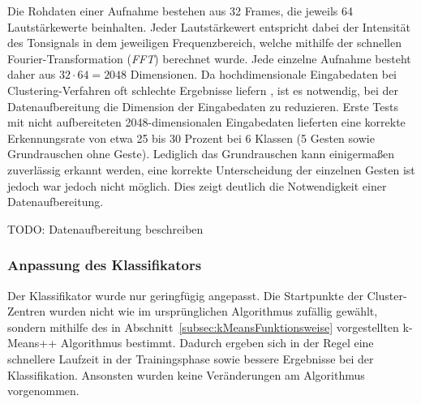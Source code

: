 Die Rohdaten einer Aufnahme bestehen aus 32 Frames, die jeweils 64 Lautstärkewerte beinhalten. Jeder Lautstärkewert entspricht dabei der Intensität des Tonsignals in dem jeweiligen Frequenzbereich, welche mithilfe der schnellen Fourier-Transformation (\emph{FFT}) \cite{fftMathebuch} berechnet wurde. Jede einzelne Aufnahme besteht daher aus $32 \cdot 64 = 2048$ Dimensionen.  Da hochdimensionale Eingabedaten bei Clustering-Verfahren oft schlechte Ergebnisse liefern \cite{kMeansHighDimensions}, ist es notwendig, bei der Datenaufbereitung die Dimension der Eingabedaten zu reduzieren.  Erste Tests mit nicht aufbereiteten 2048-dimensionalen Eingabedaten lieferten eine korrekte Erkennungsrate von etwa 25 bis 30 Prozent bei 6 Klassen (5 Gesten sowie Grundrauschen ohne Geste). Lediglich das Grundrauschen kann einigermaßen zuverlässig erkannt werden, eine korrekte Unterscheidung der einzelnen Gesten ist jedoch war jedoch nicht möglich. Dies zeigt deutlich die Notwendigkeit einer Datenaufbereitung.

TODO: Datenaufbereitung beschreiben 



\subsubsection{Anpassung des Klassifikators}
Der Klassifikator wurde nur geringfügig angepasst. Die Startpunkte der Cluster-Zentren wurden nicht wie im ursprünglichen Algorithmus zufällig gewählt, sondern mithilfe des in Abschnitt~\ref{subsec:kMeansFunktionsweise} vorgestellten k-Means++ Algorithmus bestimmt. Dadurch ergeben sich in der Regel eine schnellere Laufzeit in der Trainingsphase sowie bessere Ergebnisse bei der Klassifikation.
Ansonsten wurden keine Veränderungen am Algorithmus vorgenommen.

